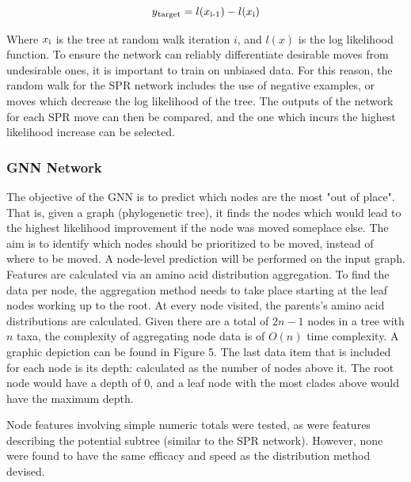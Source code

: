 \documentclass{mpaper}
\begin{document}
\[y\textsubscript{target} = l(x\textsubscript{i-1})- l(x\textsubscript{i}) \]

Where $x\textsubscript{i}$ is the tree at random walk iteration $i$, and $l(x)$ is the log likelihood function. To ensure the network can reliably differentiate desirable moves from undesirable ones, it is important to train on unbiased data. For this reason, the random walk for the SPR network includes the use of negative examples, or moves which decrease the log likelihood of the tree. The outputs of the network for each SPR move can then be compared, and the one which incurs the highest likelihood increase can be selected. 


\subsubsection{GNN Network}

The objective of the GNN is to predict which nodes are the most "out of place". That is, given a graph (phylogenetic tree), it finds the nodes which would lead to the highest likelihood improvement if the node was moved someplace else. The aim is to identify which nodes should be prioritized to be moved, instead of where to be moved. A node-level prediction will be performed on the input graph. Features are calculated via an amino acid distribution aggregation. To find the data per node, the aggregation method needs to take place starting at the leaf nodes working up to the root. At every node visited, the parents's amino acid distributions are calculated. Given there are a total of $2n-1$ nodes in a tree with $n$ taxa, the complexity of aggregating node data is of $O(n)$ time complexity. A graphic depiction can be found in Figure 5. The last data item that is included for each node is its depth: calculated as the number of nodes above it. The root node would have a depth of 0, and a leaf node with the most clades above would have the maximum depth.

Node features involving simple numeric totals were tested, as were features describing the potential subtree (similar to the SPR network). However, none were found to have the same efficacy and speed as the distribution method devised. 
\end{document}
